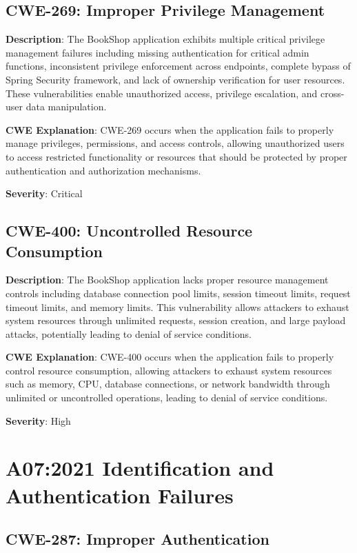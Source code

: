 \documentclass[]{UCD_CS_FYP_Report}
\begin{document}
\section{CWE-269: Improper Privilege Management}

\textbf{Description}: The BookShop application exhibits multiple critical privilege management failures including missing authentication for critical admin functions, inconsistent privilege enforcement across endpoints, complete bypass of Spring Security framework, and lack of ownership verification for user resources. These vulnerabilities enable unauthorized access, privilege escalation, and cross-user data manipulation.

\textbf{CWE Explanation}: CWE-269 occurs when the application fails to properly manage privileges, permissions, and access controls, allowing unauthorized users to access restricted functionality or resources that should be protected by proper authentication and authorization mechanisms.

\textbf{Severity}: Critical



\section{CWE-400: Uncontrolled Resource Consumption}

\textbf{Description}: The BookShop application lacks proper resource management controls including database connection pool limits, session timeout limits, request timeout limits, and memory limits. This vulnerability allows attackers to exhaust system resources through unlimited requests, session creation, and large payload attacks, potentially leading to denial of service conditions.

\textbf{CWE Explanation}: CWE-400 occurs when the application fails to properly control resource consumption, allowing attackers to exhaust system resources such as memory, CPU, database connections, or network bandwidth through unlimited or uncontrolled operations, leading to denial of service conditions.

\textbf{Severity}: High



\chapter{A07:2021 Identification and Authentication Failures}

\section{CWE-287: Improper Authentication}
\end{document}
